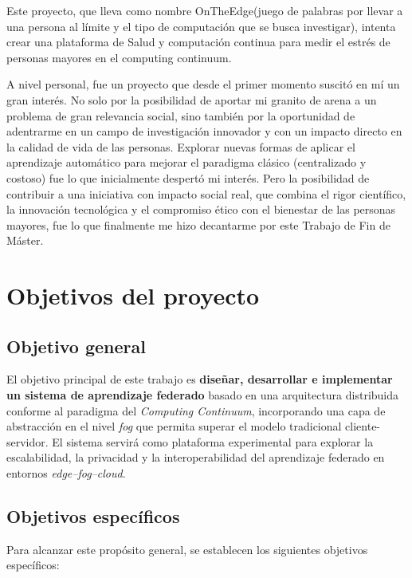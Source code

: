 \documentclass{report}
\begin{document}
Este proyecto, que lleva como nombre OnTheEdge(juego de palabras por llevar a una persona al límite y el tipo de computación que se busca investigar), intenta crear una plataforma de Salud y computación continua para medir el estrés de personas mayores en el computing continuum.

A nivel personal, fue un proyecto que desde el primer momento suscitó en mí un gran interés. No solo por la posibilidad de aportar mi granito de arena a un problema de gran relevancia social, sino también por la oportunidad de adentrarme en un campo de investigación innovador y con un impacto directo en la calidad de vida de las personas. Explorar nuevas formas de aplicar el aprendizaje automático para mejorar el paradigma clásico (centralizado y costoso) fue lo que inicialmente despertó mi interés. Pero la posibilidad de contribuir a una iniciativa con impacto social real, que combina el rigor científico, la innovación tecnológica y el compromiso ético con el bienestar de las personas mayores, fue lo que finalmente me hizo decantarme por este Trabajo de Fin de Máster.



\section{Objetivos del proyecto}
\label{Objetivos}
\subsection{Objetivo general}
El objetivo principal de este trabajo es \textbf{diseñar, desarrollar e implementar un sistema de aprendizaje federado} basado en una arquitectura distribuida conforme al paradigma del \textit{Computing Continuum}, incorporando una capa de abstracción en el nivel \textit{fog} que permita superar el modelo tradicional cliente-servidor.  
El sistema servirá como plataforma experimental para explorar la escalabilidad, la privacidad y la interoperabilidad del aprendizaje federado en entornos \textit{edge–fog–cloud}.

\subsection{Objetivos específicos}

Para alcanzar este propósito general, se establecen los siguientes objetivos específicos:
\end{document}
